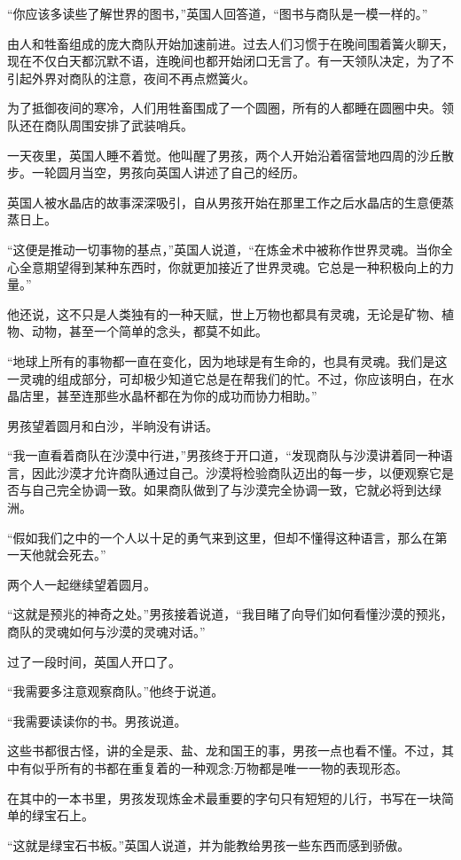 \documentclass[twoside,openany]{book}
\begin{document}
“你应该多读些了解世界的图书，”英国人回答道，“图书与商队是一模一样的。”

由人和牲畜组成的庞大商队开始加速前进。过去人们习惯于在晚间围着簧火聊天，现在不仅白天都沉默不语，连晚间也都开始闭口无言了。有一天领队决定，为了不引起外界对商队的注意，夜间不再点燃簧火。

为了抵御夜间的寒冷，人们用牲畜围成了一个圆圈，所有的人都睡在圆圈中央。领队还在商队周围安排了武装哨兵。

一天夜里，英国人睡不着觉。他叫醒了男孩，两个人开始沿着宿营地四周的沙丘散步。一轮圆月当空，男孩向英国人讲述了自己的经历。

英国人被水晶店的故事深深吸引，自从男孩开始在那里工作之后水晶店的生意便蒸蒸日上。

“这便是推动一切事物的基点，”英国人说道，“在炼金术中被称作世界灵魂。当你全心全意期望得到某种东西时，你就更加接近了世界灵魂。它总是一种积极向上的力量。”

他还说，这不只是人类独有的一种天赋，世上万物也都具有灵魂，无论是矿物、植物、动物，甚至一个简单的念头，都莫不如此。

“地球上所有的事物都一直在变化，因为地球是有生命的，也具有灵魂。我们是这一灵魂的组成部分，可却极少知道它总是在帮我们的忙。不过，你应该明白，在水晶店里，甚至连那些水晶杯都在为你的成功而协力相助。”

男孩望着圆月和白沙，半晌没有讲话。

“我一直看着商队在沙漠中行进，”男孩终于开口道，“发现商队与沙漠讲着同一种语言，因此沙漠才允许商队通过自己。沙漠将检验商队迈出的每一步，以便观察它是否与自己完全协调一致。如果商队做到了与沙漠完全协调一致，它就必将到达绿洲。

“假如我们之中的一个人以十足的勇气来到这里，但却不懂得这种语言，那么在第一天他就会死去。”

两个人一起继续望着圆月。

“这就是预兆的神奇之处。”男孩接着说道，“我目睹了向导们如何看懂沙漠的预兆，商队的灵魂如何与沙漠的灵魂对话。”

过了一段时间，英国人开口了。

“我需要多注意观察商队。”他终于说道。

“我需要读读你的书。男孩说道。

这些书都很古怪，讲的全是汞、盐、龙和国王的事，男孩一点也看不懂。不过，其中有似乎所有的书都在重复着的一种观念:万物都是唯一一物的表现形态。

在其中的一本书里，男孩发现炼金术最重要的字句只有短短的儿行，书写在一块简单的绿宝石上。

“这就是绿宝石书板。”英国人说道，并为能教给男孩一些东西而感到骄傲。 
\end{document}
